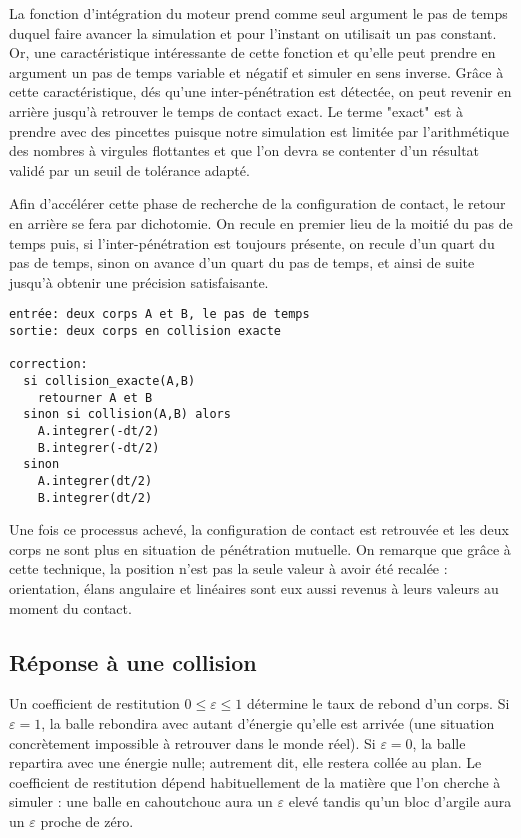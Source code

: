 La fonction d'intégration du moteur prend comme seul argument le pas
de temps duquel faire avancer la simulation et pour l'instant on
utilisait un pas constant. Or, une caractéristique intéressante de
cette fonction et qu'elle peut prendre en argument un pas de temps
variable et négatif et simuler en sens inverse. Grâce à cette
caractéristique, dés qu'une inter-pénétration est détectée, on peut
revenir en arrière jusqu'à retrouver le temps de contact exact. Le
terme "exact" est à prendre avec des pincettes puisque notre
simulation est limitée par l'arithmétique des nombres à virgules
flottantes et que l'on devra se contenter d'un résultat validé par un
seuil de tolérance adapté.

Afin d'accélérer cette phase de recherche de la configuration de
contact, le retour en arrière se fera par dichotomie. On recule en
premier lieu de la moitié du pas de temps puis, si l'inter-pénétration
est toujours présente, on recule d'un quart du pas de temps, sinon on
avance d'un quart du pas de temps, et ainsi de suite jusqu'à obtenir
une précision satisfaisante.

\begin{verbatim}
entrée: deux corps A et B, le pas de temps
sortie: deux corps en collision exacte

correction:
  si collision_exacte(A,B)
    retourner A et B
  sinon si collision(A,B) alors
    A.integrer(-dt/2)
    B.integrer(-dt/2)
  sinon
    A.integrer(dt/2)
    B.integrer(dt/2)

\end{verbatim}

Une fois ce processus achevé, la configuration de contact est
retrouvée et les deux corps ne sont plus en situation de pénétration
mutuelle. On remarque que grâce à cette technique, la position n'est
pas la seule valeur à avoir été recalée : orientation, élans angulaire
et linéaires sont eux aussi revenus à leurs valeurs au moment du
contact.

\subsection{Réponse à une collision}

Un coefficient de restitution $0 \leq \varepsilon \leq 1$ détermine le
taux de rebond d'un corps. Si $\varepsilon = 1$, la balle rebondira
avec autant d'énergie qu'elle est arrivée (une situation concrètement
impossible à retrouver dans le monde réel). Si $\varepsilon = 0$, la
balle repartira avec une énergie nulle; autrement dit, elle restera
collée au plan. Le coefficient de restitution dépend habituellement de
la matière que l'on cherche à simuler : une balle en cahoutchouc aura
un $\varepsilon$ elevé tandis qu'un bloc d'argile aura un
$\varepsilon$ proche de zéro.

